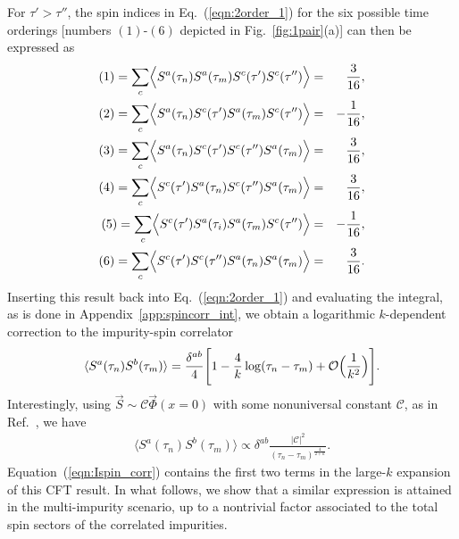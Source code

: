 \documentclass[aps,prb,twocolumn,superscriptaddress]{revtex4-1}
\begin{document}
For $\tau'>\tau''$, the spin indices in Eq.~(\ref{eqn:2order_1}) for the six possible time orderings [numbers $(1)$-$(6)$ depicted in Fig.~\ref{fig:1pair}(a)] can then be expressed as
\begin{eqnarray}
(1)=\sum_{c}\Bigl\langle{S^{a}(\tau_{n})S^{a}(\tau_{m})S^{c}(\tau')S^{c}(\tau'')\Bigr\rangle}&=&\frac{3}{16}, \nonumber \\ 
(2)=\sum_{c}\Bigl\langle{S^{a}(\tau_{n})S^{c}(\tau')S^{a}(\tau_{m})S^{c}(\tau'')\Bigr\rangle}&=&-\frac{1}{16}, \nonumber \\ 
(3)=\sum_{c}\Bigl\langle{S^{a}(\tau_{n})S^{c}(\tau')S^{c}(\tau'')S^{a}(\tau_{m})\Bigr\rangle}&=&\frac{3}{16}, \nonumber \\ 
(4)=\sum_{c}\Bigl\langle{S^{c}(\tau')S^{a}(\tau_{n})S^{c}(\tau'')S^{a}(\tau_{m})\Bigr\rangle}&=&\frac{3}{16}, \nonumber \\ 
(5)=\sum_{c}\Bigl\langle{S^{c}(\tau')S^{a}(\tau_{i})S^{a}(\tau_{m})S^{c}(\tau'')\Bigr\rangle}&=&-\frac{1}{16}, \nonumber \\ 
(6)=\sum_{c}\Bigl\langle{S^{c}(\tau')S^{c}(\tau'')S^{a}(\tau_{n})S^{a}(\tau_{m})\Bigr\rangle}&=&\frac{3}{16}. \label{eqn:2order_2}
\end{eqnarray}
Inserting this result back into Eq.~(\ref{eqn:2order_1}) and evaluating the integral, as is done in Appendix~\ref{app:spincorr_int}, we obtain a logarithmic $k$-dependent correction to the impurity-spin correlator
\begin{eqnarray}
\braket{S^{a}(\tau_{n})S^{b}(\tau_{m})}=\frac{\delta^{ab}}{4}\Biggl[1-\frac{4}{k}\log(\tau_{n}-\tau_{m})+\mathcal{O}\Bigl(\frac{1}{k^{2}}\Bigr)\Biggr]. \nonumber \\ \label{eqn:Ispin_corr}
\end{eqnarray}
Interestingly, using $\vec{S} \sim \mathcal{C} \vec{\Phi}(x=0)$ with some nonuniversal constant $\mathcal{C}$, as in Ref.~, we have  
\begin{eqnarray}
\langle S^a(\tau_n) S^b(\tau_m) \rangle \propto \delta^{ab}\frac{|\mathcal{C}|^{2}}{(\tau_n - \tau_m)^{\frac{4}{2+k}}}. \label{eqn:Ispin_corr_cft}
\end{eqnarray}
Equation~(\ref{eqn:Ispin_corr}) contains the first two terms in the large-$k$ expansion of this CFT result. In what follows, we show that a similar expression is attained in the multi-impurity scenario, up to a nontrivial factor associated to the total spin sectors of the correlated impurities. 
\end{document}
